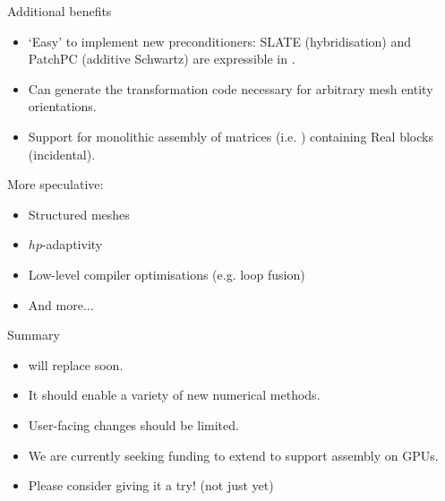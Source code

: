 \documentclass[aspectratio=169]{beamer}
\begin{document}
\begin{frame}{Additional benefits}
  \begin{itemize}
    \item
      `Easy' to implement new preconditioners: SLATE (hybridisation) and PatchPC (additive Schwartz) are expressible in .
    \item
      Can generate the transformation code necessary for arbitrary mesh entity orientations.
    \item Support for monolithic assembly of matrices (i.e. ) containing Real blocks (incidental).
  \end{itemize}

  More speculative:

  \begin{itemize}
    \item Structured meshes
    \item $hp$-adaptivity
    \item Low-level compiler optimisations (e.g. loop fusion)
    \item And more...
  \end{itemize}
\end{frame}

\begin{frame}{Summary}
  \begin{itemize}
    \item
       will replace  soon.
    \item
      It should enable a variety of new numerical methods.
    \item
      User-facing changes should be limited.
  \end{itemize}

  \vspace{1em}

  \begin{itemize}
    \item
      We are currently seeking funding to extend  to support assembly on GPUs.
    \item
      Please consider giving it a try! (not just yet)
  \end{itemize}
\end{frame}

%
\end{document}
